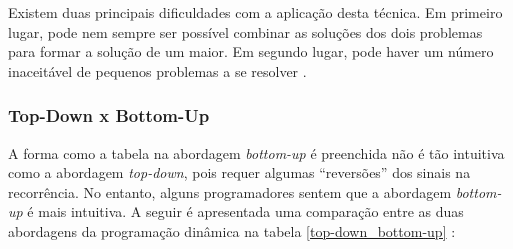 Existem duas principais dificuldades com a aplicação desta técnica. Em primeiro lugar, pode nem sempre ser possível combinar as soluções dos dois problemas para formar a solução de um maior. Em segundo lugar, pode haver um número inaceitável de pequenos problemas a se resolver \cite{Sedgewick:2011}.

\subsubsection{Top-Down x Bottom-Up}

A forma como a tabela na abordagem \textit{bottom-up} é preenchida não é tão intuitiva como a abordagem \textit{top-down}, pois requer algumas ``reversões'' dos sinais na recorrência. No entanto, alguns programadores sentem que a abordagem \textit{bottom-up} é mais intuitiva. A seguir é apresentada uma comparação entre as duas abordagens da programação dinâmica na tabela \ref{top-down_bottom-up} \cite{Halim:Halim:2013}:

